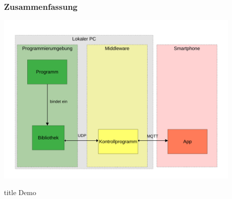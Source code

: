 \documentclass{beamer}
\begin{document}
\begin{frame}
    \frametitle{Zusammenfassung}
    \vfill
    \centering
    \includegraphics[width=0.9\textwidth]{images/framework.pdf}
\end{frame}

\begin{frame}
    \vfill
    \centering
    \begin{beamercolorbox}[sep=8pt,center,shadow=true,rounded=true]{title}
      Demo
    \end{beamercolorbox}
    \vfill
    \end{frame}
\end{document}
